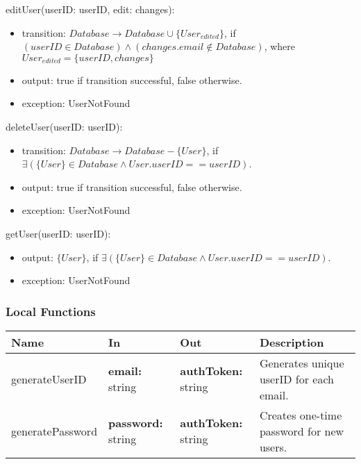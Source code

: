 \documentclass[12pt, titlepage]{article}
\begin{document}
\noindent editUser(userID: userID, edit: changes):
\begin{itemize}
  \item transition: $Database \rightarrow Database \cup
    \{User_{edited}\}$, if $(userID \in Database) \wedge
    (changes.email \notin Database)$, where $User_{edited} =
    \{userID, changes\}$
  \item output: true if transition successful, false otherwise.
  \item exception: UserNotFound
\end{itemize}

\noindent deleteUser(userID: userID):
\begin{itemize}
  \item transition: $Database \rightarrow Database - \{User\}$, if
    $\exists(\{User\} \in Database \wedge User.userID == userID)$.
  \item output: true if transition successful, false otherwise.
  \item exception: UserNotFound
\end{itemize}

\noindent getUser(userID: userID):
\begin{itemize}
  \item output: $\{User\}$, if $\exists(\{User\} \in Database \wedge
    User.userID == userID)$.
  \item exception: UserNotFound
\end{itemize}

\subsubsection{Local Functions}

\begin{center}
  \begin{tabular}{>{\raggedright}p{3cm} >{\raggedright}p{4cm}
    >{\raggedright}p{4cm} p{4.5cm}}
    \hline
    \textbf{Name} & \textbf{In} & \textbf{Out} & \textbf{Description} \\
    \hline
    generateUserID & \textbf{email:} string & \textbf{authToken:} string &
    Generates unique userID for each email. \\
    \hline
    generatePassword & \textbf{password:} string & \textbf{authToken:} string &
    Creates one-time password for new users.\\
    \hline
  \end{tabular}
\end{center}
\end{document}

